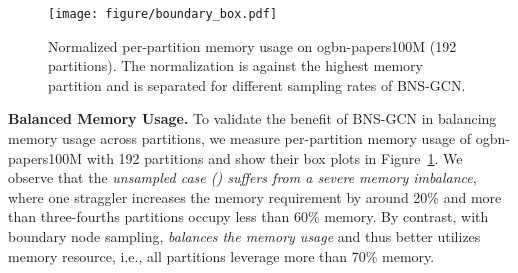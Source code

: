 \documentclass{article}
\newcommand{\niparagraph}[1]{\noindent\textbf{#1}}
\begin{document}
\begin{figure}[t]
    \centering
    \texttt{[image: figure/boundary\_box.pdf]}
    \caption{
    Normalized per-partition memory usage on ogbn-papers100M (192 partitions).
    The normalization is against the highest memory partition and is separated for different sampling rates  of BNS-GCN.}
    \label{fig:bd_box}
\end{figure}

\niparagraph{Balanced Memory Usage.} 
To validate the benefit of BNS-GCN in balancing memory usage across partitions, we measure per-partition memory usage of ogbn-papers100M with 192 partitions and show their box plots in Figure~\ref{fig:bd_box}.
We observe that the \textit{unsampled case () suffers from a severe memory imbalance}, where one straggler increases the memory requirement by around 20\% and more than three-fourths partitions occupy less than 60\% memory. 
By contrast, with boundary node sampling, \textit{ balances the memory usage} and thus better utilizes memory resource, i.e., all partitions leverage more than 70\% memory.
\end{document}
